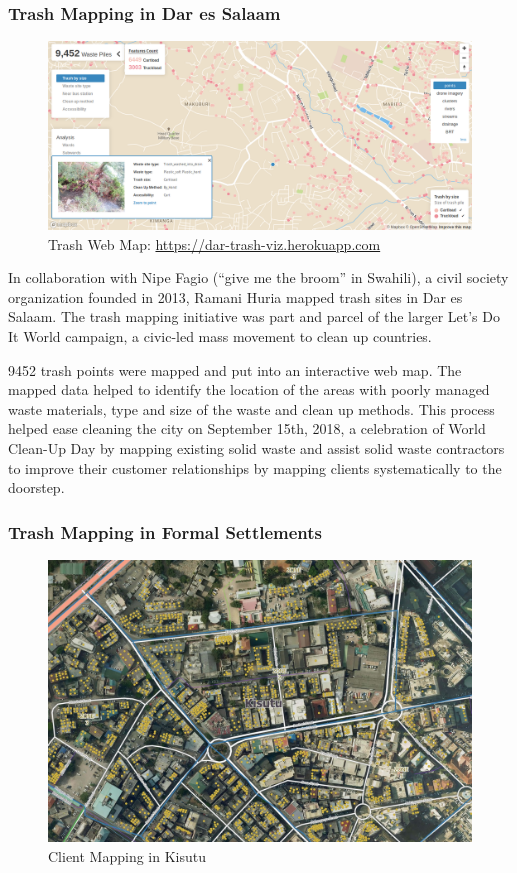 \documentclass[a4paper,12pt,twoside]{article}
\begin{document}
\subsubsection{Trash Mapping in Dar es Salaam}
	\begin{figure}[h]
	\centering
	\includegraphics[width=.8\textwidth]{images/dar_trash.PNG}
	\caption{Trash Web Map: \href{https://dar-trash-viz.herokuapp.com}{https://dar-trash-viz.herokuapp.com}}
\end{figure}
\begin{multicols}{2}
In collaboration with Nipe Fagio (“give me the broom” in Swahili), a civil society organization founded in 2013, Ramani Huria mapped trash sites in Dar es Salaam. The trash mapping initiative was part and parcel of the larger Let’s Do It World campaign, a civic-led mass movement to clean up countries.

9452 trash points were mapped and put into an interactive web map. The mapped data helped to identify the location of the areas with poorly managed waste materials, type and size of the waste and clean up methods. This process helped ease cleaning the city on September 15th, 2018, a celebration of World Clean-Up Day by mapping existing solid waste and assist solid waste contractors to improve their customer relationships by mapping clients systematically to the doorstep.
\end{multicols}

\subsubsection{Trash Mapping in Formal Settlements}
\begin{figure}[h]
	\centering
	\includegraphics[width=.8\textwidth]{images/Trashmapsample.jpeg}
	\caption{Client Mapping in Kisutu}
\end{figure}
\end{document}
